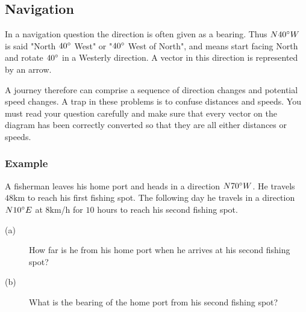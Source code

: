 \subsection{Navigation}
In a navigation question the direction is often given as a bearing. Thus $N 40 \mbox{{\ensuremath{{}^\circ}}} W$ is said "North $40 \mbox{{\ensuremath{{}^\circ}}}$ West" or "$40 \mbox{{\ensuremath{{}^\circ}}}$ West of North", and means start facing North and rotate $40 \mbox{{\ensuremath{{}^\circ}}}$ in a Westerly direction. A vector in this direction
is represented by an arrow. 

   
\setlength\fboxrule{0in}\setlength\fboxsep{0.2in}


A journey therefore can comprise a sequence of direction changes and potential speed changes. A
trap in these problems is to confuse distances and speeds. You must read your question carefully and make sure
that every vector on the diagram has been correctly converted so that they are all either distances or speeds. 

\subsubsection{Example}
A fisherman leaves his home port and heads in a direction $N 70 \mbox{{\ensuremath{{}^\circ}}} W$. He travels $48 \mbox{km}$ to reach his first fishing spot. The following
day he travels in a direction $N 10 \mbox{{\ensuremath{{}^\circ}}} E$ at $8 \mbox{km}$/$\mbox{h}$ for $10$ hours to reach his second fishing spot. 


\begin{description}
\item [(a)] How far is he from his home port when he arrives at his second
fishing spot? 

\item [(b)] What is the bearing of the home
port from his second fishing spot? 
\end{description}

